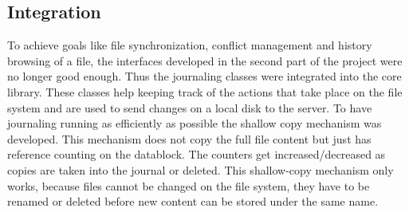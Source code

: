 \subsection{Integration}
To achieve goals like file synchronization, conflict management and history
browsing of a file, the interfaces developed in the second part of the project
were no longer good enough. Thus the journaling classes were integrated into the
core library. These classes help keeping track of the actions that take place on the
file system and are used to send changes on a local disk to the server. To have
journaling running as efficiently as possible the shallow copy mechanism was
developed. This mechanism does not copy the full file content but just has
reference counting on the datablock. The counters get increased/decreased
as copies are taken into the journal or deleted. This shallow-copy mechanism
only works, because files cannot be changed on the file system, they have to be renamed or deleted before
new content can be stored under the same name.
